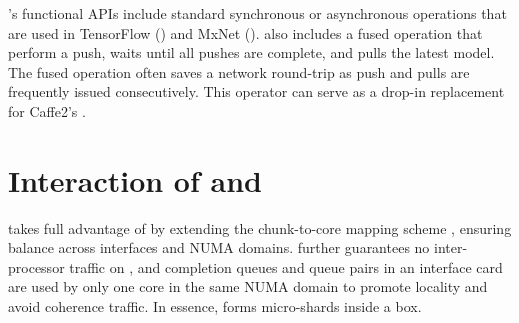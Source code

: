 \phub{}'s functional APIs include standard synchronous or asynchronous  operations that are used in TensorFlow () and MxNet (). \phub also includes a fused  operation that perform a push, waits until all pushes are complete, and pulls the latest model. The fused operation often saves a network round-trip as push and pulls are frequently issued consecutively. This operator can serve as a drop-in replacement for Caffe2's .


\section{Interaction of \pbox and \phub}
\phub takes full advantage of \pbox by extending the chunk-to-core mapping scheme%
, ensuring balance across interfaces and NUMA domains. \phub further guarantees no inter-processor traffic on \pbox, and completion queues and queue pairs in an interface card are used by only one core in the same NUMA domain to promote locality and avoid coherence traffic. In essence, \pbox forms micro-shards inside a box.

